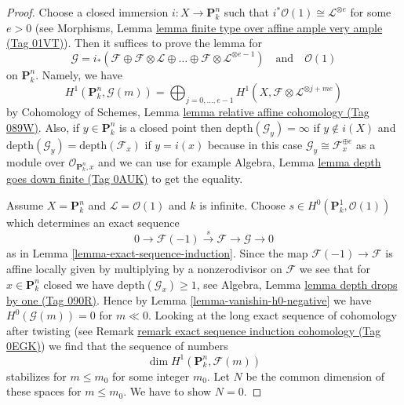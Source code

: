 \documentclass{amsart}
\theoremstyle{plain}
\theoremstyle{definition}
\theoremstyle{remark}
\numberwithin{equation}{subsection}
\begin{document}
\begin{proof}
Choose a closed immersion $i : X \to \mathbf{P}^n_k$ such that
$i^*\mathcal{O}(1) \cong \mathcal{L}^{\otimes e}$ for some $e > 0$
(see Morphisms, Lemma
\href{https://stacks.math.columbia.edu/tag/01VT}{lemma finite type over affine ample very ample (Tag 01VT)}).
Then it suffices to prove the lemma for
$$
\mathcal{G} =
i_*(\mathcal{F} \oplus \mathcal{F} \otimes \mathcal{L} \oplus \ldots
\oplus \mathcal{F} \otimes \mathcal{L}^{\otimes e - 1})
\quad\text{and}\quad \mathcal{O}(1)
$$
on $\mathbf{P}^n_k$. Namely, we have
$$
H^1(\mathbf{P}^n_k, \mathcal{G}(m)) =
\bigoplus\nolimits_{j = 0, \ldots, e - 1}
H^1(X, \mathcal{F} \otimes \mathcal{L}^{\otimes j + me})
$$
by
Cohomology of Schemes, Lemma \href{https://stacks.math.columbia.edu/tag/089W}{lemma relative affine cohomology (Tag 089W)}.
Also, if $y \in \mathbf{P}^n_k$ is a closed point then
$\text{depth}(\mathcal{G}_y) = \infty$ if $y \not \in i(X)$
and $\text{depth}(\mathcal{G}_y) = \text{depth}(\mathcal{F}_x)$
if $y = i(x)$ because in this case
$\mathcal{G}_y \cong \mathcal{F}_x^{\oplus e}$ as a module over
$\mathcal{O}_{\mathbf{P}^n_k, x}$ and we can use for example
Algebra, Lemma \href{https://stacks.math.columbia.edu/tag/0AUK}{lemma depth goes down finite (Tag 0AUK)}
to get the equality.

\medskip\noindent
Assume $X = \mathbf{P}^n_k$ and $\mathcal{L} = \mathcal{O}(1)$ and
$k$ is infinite. Choose $s \in H^0(\mathbf{P}^1_k, \mathcal{O}(1))$
which determines an exact sequence
$$
0 \to \mathcal{F}(-1) \xrightarrow{s} \mathcal{F} \to \mathcal{G} \to 0
$$
as in Lemma \ref{lemma-exact-sequence-induction}. Since the map
$\mathcal{F}(-1) \to \mathcal{F}$ is affine locally given by
multiplying by a nonzerodivisor on $\mathcal{F}$
we see that for $x \in \mathbf{P}^n_k$ closed we have
$\text{depth}(\mathcal{G}_x) \geq 1$, see
Algebra, Lemma \href{https://stacks.math.columbia.edu/tag/090R}{lemma depth drops by one (Tag 090R)}.
Hence by Lemma \ref{lemma-vanishin-h0-negative}
we have $H^0(\mathcal{G}(m)) = 0$ for $m \ll 0$.
Looking at the long exact sequence of cohomology after twisting
(see Remark \href{https://stacks.math.columbia.edu/tag/0EGK}{remark exact sequence induction cohomology (Tag 0EGK)})
we find that the sequence of numbers
$$
\dim H^1(\mathbf{P}^n_k, \mathcal{F}(m))
$$
stabilizes for $m \leq m_0$ for some integer $m_0$.
Let $N$ be the common dimension of these
spaces for $m \leq m_0$. We have to show $N = 0$.


\end{proof}
\end{document}
